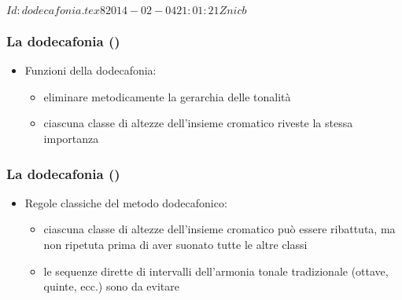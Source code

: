 %
%
\svnInfo $Id: dodecafonia.tex 8 2014-02-04 21:01:21Z nicb $

\setcounter{ms}{0}
\begin{frame}
    \frametitle{La dodecafonia ()}

    \begin{itemize}

        \item Funzioni della dodecafonia:

        \begin{itemize}

            \item eliminare metodicamente la gerarchia delle tonalit\`a

            \item ciascuna classe di altezze dell'insieme cromatico
                riveste la stessa importanza

        \end{itemize}

    \end{itemize}

\end{frame}

\begin{frame}
    \frametitle{La dodecafonia ()}

    \begin{itemize}

        \item Regole classiche del metodo dodecafonico:

        \begin{itemize}

            \item ciascuna classe di altezze dell'insieme cromatico
                pu\`o essere ribattuta, ma non ripetuta prima di aver suonato
                tutte le altre classi

            \item le sequenze dirette di intervalli dell'armonia tonale tradizionale
                (ottave, quinte, ecc.) sono da evitare

       \end{itemize}

    \end{itemize}

\end{frame}

